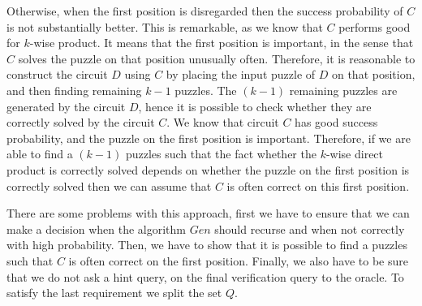 Otherwise, when the first position is disregarded then the success probability of $C$ is not substantially better.
This is remarkable, as we know that $C$ performs good for $k$-wise product. It means that the first position is important,
in the sense that $C$ solves the puzzle on that position unusually often.
Therefore, it is reasonable to construct the circuit $D$ using $C$ by placing the input puzzle of $D$ on that position, and then
finding remaining $k-1$ puzzles. The $(k-1)$ remaining puzzles are generated by the circuit $D$, hence it is possible to check
whether they are correctly solved by the circuit $C$. We know that circuit $C$ has good success probability, and the puzzle on the first
position is important. Therefore, if we are able to find a $(k-1)$ puzzles such that the fact whether the $k$-wise direct product is correctly
solved depends on whether the puzzle on the first position is correctly solved then we can assume that $C$ is often correct on this first position.

There are some problems with this approach, first we have to ensure that we can make a decision when the algorithm $Gen$ should recurse and when not
correctly with high probability. Then, we have to show that it is possible to find a puzzles such that $C$ is often correct on the first position.
Finally, we also have to be sure that we do not ask a hint query, on the final verification query to the oracle.
To satisfy the last requirement we split the set $Q$.

